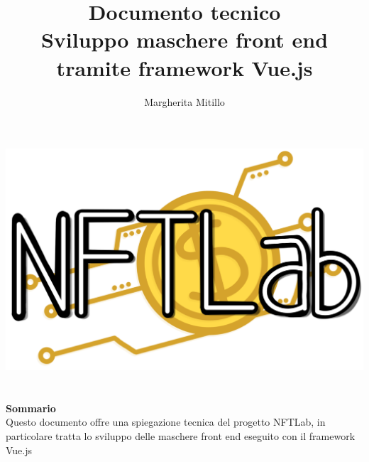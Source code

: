 


\setcounter{secnumdepth}{5}
\setcounter{tocdepth}{5}



\makeatletter
\begin{titlepage}
	\begin{center}
		\vspace*{-1,0cm}
		\title{Documento tecnico \\Sviluppo maschere front end tramite framework Vue.js}
		\author{Margherita Mitillo}
		\date{} %
		\includegraphics[width=0.5\linewidth]{immagini/logo.png}\\[4ex]
		{\huge \bfseries  \@title }\\[2ex]
		{\LARGE  \@author}\\[50ex]
		\vspace*{-5,0cm}
		\vspace{0.2cm}
		\hfill \break
		\fontsize{17}{10}\textbf{Sommario} \\
		\vspace{0.3cm}
		Questo documento offre una spiegazione tecnica del progetto NFTLab, in particolare tratta lo sviluppo delle maschere front end eseguito con il framework Vue.js
	\end{center}
\end{titlepage}
\makeatother

\tableofcontents{}




